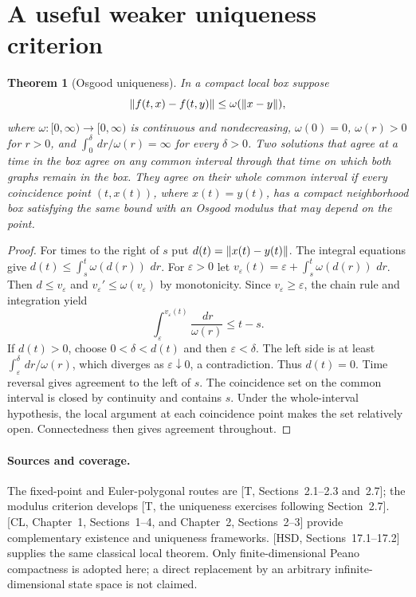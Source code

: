 \documentclass[11pt,oneside]{book}
\newtheorem{theorem}{Theorem}[chapter]
\theoremstyle{definition}
\theoremstyle{remark}\newtheorem{remark}[theorem]{Remark}
\newcommand{\dd}{\,d}\newcommand{\id}{\operatorname{id}}
\begin{document}
\section{A useful weaker uniqueness criterion}
\begin{theorem}[Osgood uniqueness]\label{d13:03:osgood}
In a compact local box suppose
\[
 \lVert f(t,x)-f(t,y)\rVert\leq\omega(\lVert x-y\rVert),
\]
where $\omega:[0,\infty)\to[0,\infty)$ is continuous and
nondecreasing, $\omega(0)=0$, $\omega(r)>0$ for $r>0$, and
$\int_0^\delta \dd r/\omega(r)=\infty$ for every $\delta>0$.
Two solutions that agree at a time in the box agree on any common interval through that time on which both graphs remain in the box.
They agree on their whole common interval if every coincidence point \((t,x(t))\), where \(x(t)=y(t)\), has a compact neighborhood box
satisfying the same bound with an Osgood modulus that may depend on the point.
\end{theorem}
\begin{proof}
For times to the right of $s$ put $d(t)=\lVert x(t)-y(t)\rVert$. The
integral equations give $d(t)\leq\int_s^t\omega(d(r))\,\dd r$.
For $\varepsilon>0$ let
$v_\varepsilon(t)=\varepsilon+\int_s^t\omega(d(r))\,\dd r$.
Then $d\leq v_\varepsilon$ and
$v_\varepsilon'\leq\omega(v_\varepsilon)$ by monotonicity. Since
$v_\varepsilon\geq\varepsilon$, the chain rule and integration yield
\[
 \int_\varepsilon^{v_\varepsilon(t)}
       \frac{\dd r}{\omega(r)}\leq t-s.
\]
If $d(t)>0$, choose $0<\delta<d(t)$ and then $\varepsilon<\delta$.
The left side is at least $\int_\varepsilon^\delta\dd r/\omega(r)$,
which diverges as $\varepsilon\downarrow0$, a contradiction. Thus
$d(t)=0$. Time reversal gives agreement to the left of $s$. The coincidence set on the common interval is closed by continuity and contains $s$.
Under the whole-interval hypothesis, the local argument at each coincidence point makes the set relatively open. Connectedness then gives agreement throughout.
\end{proof}

\paragraph{Sources and coverage.}
The fixed-point and Euler-polygonal routes are [T, Sections~2.1--2.3
and~2.7]; the modulus criterion develops [T, the uniqueness exercises
following Section~2.7]. [CL, Chapter~1, Sections~1--4, and Chapter~2,
Sections~2--3] provide complementary existence and uniqueness frameworks.
[HSD, Sections~17.1--17.2] supplies the same classical local theorem.
Only finite-dimensional Peano compactness is adopted here; a direct
replacement by an arbitrary infinite-dimensional state space is not claimed.
\end{document}

